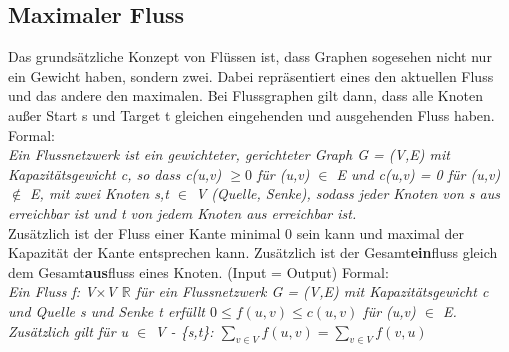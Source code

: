 \documentclass[
../../AuD-Zusammenfassung.tex,
]
{subfiles}
\begin{document}
\newpage
\subsection{Maximaler Fluss}
Das grundsätzliche Konzept von Flüssen ist, dass Graphen sogesehen nicht nur ein Gewicht haben, sondern zwei. Dabei repräsentiert eines den aktuellen Fluss und das andere den maximalen. Bei Flussgraphen gilt dann, dass alle Knoten außer Start s und Target t gleichen eingehenden und ausgehenden Fluss haben. Formal:\\
\textit{Ein Flussnetzwerk ist ein gewichteter, gerichteter Graph G = (V,E) mit Kapazitätsgewicht c, so dass c(u,v) $\geq 0$ für (u,v) $\in$ E und c(u,v) = 0 für (u,v) $\notin$ E, mit zwei Knoten s,t $\in$ V (Quelle, Senke), sodass jeder Knoten von s aus erreichbar ist und t von jedem Knoten aus erreichbar ist.}\\
Zusätzlich ist der Fluss einer Kante minimal 0 sein kann und maximal der Kapazität der Kante entsprechen kann. Zusätzlich ist der Gesamt\textbf{ein}fluss gleich dem Gesamt\textbf{aus}fluss eines Knoten. (Input = Output) Formal:\\
\textit{Ein Fluss f: V$ \times $V \rightarrow $\mathbb{R}$ für ein Flussnetzwerk G = (V,E) mit Kapazitätsgewicht c und Quelle s und Senke t erfüllt $0 \leq f(u,v) \leq c(u,v)$ für (u,v) $\in$ E. Zusätzlich gilt für u $\in$ V - \{s,t\}: $\sum_{v \in V} f(u,v) = \sum_{v \in V} f(v,u)$}\\
\end{document}
